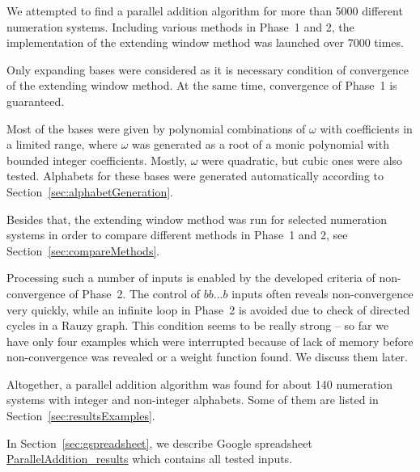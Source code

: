 We attempted to find a parallel addition algorithm for more than 5000 different numeration systems. Including various methods in Phase~1 and 2, the implementation of the extending window method was launched over 7000 times. 

Only expanding bases were considered as it is  necessary condition of convergence of the extending window method. At the same time, convergence of Phase~1 is guaranteed.

Most of the bases were given by polynomial combinations of $\omega$ with coefficients in a limited range, where $\omega$ was generated as a root of a monic polynomial with bounded integer coefficients. Mostly, $\omega$ were  quadratic, but cubic ones were also tested. Alphabets for these bases were generated automatically according to Section~\ref{sec:alphabetGeneration}.

Besides that, the extending window method was run for selected numeration systems in order to compare different methods in Phase~1 and 2, see  Section~\ref{sec:compareMethods}.

Processing such a number of inputs is enabled by the developed criteria of non-convergence of Phase~2. The control of $bb\dots b$ inputs often reveals non-convergence very quickly, while an infinite loop in Phase~2 is avoided due to check of directed cycles in a Rauzy graph. This condition seems to be really strong -- so far we have only four examples which were interrupted because of lack of memory before non-convergence was revealed or a weight function found. We discuss them later.

Altogether, a parallel addition algorithm was found for about 140
numeration systems with integer and non-integer alphabets. Some of them are listed in Section~\ref{sec:resultsExamples}.

In Section~\ref{sec:gspreadsheet}, we describe Google spreadsheet \href{https://docs.google.com/spreadsheets/d/1TnhrHdefHfHa0WSeVs4q6XVj3epjPlPlnoekE0E1xeM/edit?usp=sharing}{ParallelAddition\_results} which contains all tested inputs.

